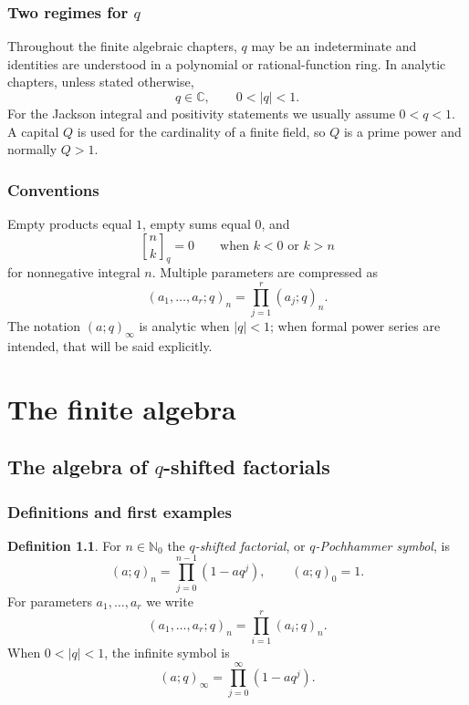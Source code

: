 \documentclass[11pt,oneside,openany]{book}
\theoremstyle{definition}
\newtheorem{definition}[definition]{Definition}
\theoremstyle{remark}
\newcommand{\qbinom}[2]{\genfrac{[}{]}{0pt}{}{#1}{#2}_{q}}
\newcommand{\C}{\mathbb C}
\newcommand{\N}{\mathbb N}
\newcommand{\abs}[1]{\lvert #1\rvert}
\begin{document}
\section*{Two regimes for $q$}
Throughout the finite algebraic chapters, $q$ may be an indeterminate and identities are understood in a polynomial or rational-function ring.  In analytic chapters, unless stated otherwise,
\[
  q\in\C,\qquad 0<\abs q<1.
\]
For the Jackson integral and positivity statements we usually assume $0<q<1$.  A capital $Q$ is used for the cardinality of a finite field, so $Q$ is a prime power and normally $Q>1$.

\section*{Conventions}
Empty products equal $1$, empty sums equal $0$, and
\[
 \qbinom nk=0\qquad\text{when }k<0\text{ or }k>n
\]
for nonnegative integral $n$.  Multiple parameters are compressed as
\[
 (a_1,\ldots,a_r;q)_n=\prod_{j=1}^r(a_j;q)_n.
\]
The notation $(a;q)_\infty$ is analytic when $\abs q<1$; when formal power series are intended, that will be said explicitly.

\tableofcontents

\mainmatter

\part{The finite algebra}

\chapter{The algebra of \texorpdfstring{$q$}{q}-shifted factorials}\label{chap:pochhammer}

\section{Definitions and first examples}

\begin{definition}
For $n\in\N_0$ the \emph{$q$-shifted factorial}, or \emph{$q$-Pochhammer symbol}, is
\[
 (a;q)_n=\prod_{j=0}^{n-1}(1-aq^j),\qquad (a;q)_0=1.
\]
For parameters $a_1,\dots,a_r$ we write
\[
 (a_1,\dots,a_r;q)_n=\prod_{i=1}^r(a_i;q)_n.
\]
When $0<\abs q<1$, the infinite symbol is
\[
 (a;q)_\infty=\prod_{j=0}^{\infty}(1-aq^j).
\]
\end{definition}
\end{document}
